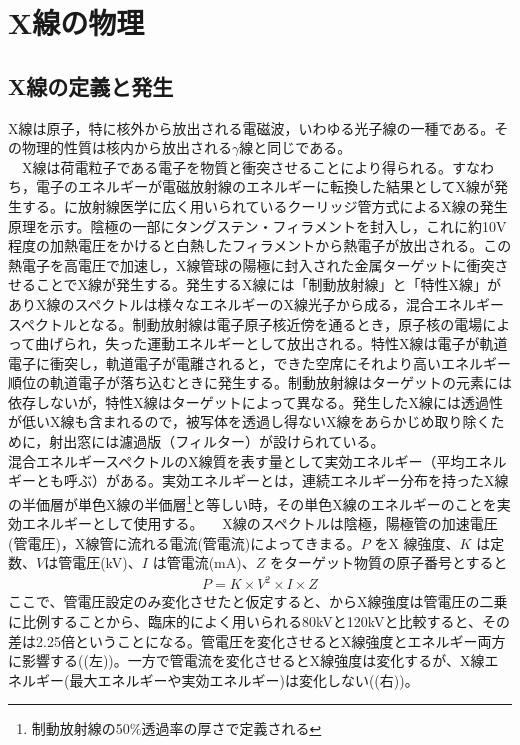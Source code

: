 
\chapter{X線の物理}
\section{X線の定義と発生}
X線は原子，特に核外から放出される電磁波，いわゆる光子線の一種である。その物理的性質は核内から放出される$\gamma$線と同じである。\\
\ \ X線は荷電粒子である電子を物質と衝突させることにより得られる。すなわち，電子のエネルギーが電磁放射線のエネルギーに転換した結果としてX線が発生する。に放射線医学に広く用いられているクーリッジ管方式によるX線の発生原理を示す。陰極の一部にタングステン・フィラメントを封入し，これに約10V程度の加熱電圧をかけると白熱したフィラメントから熱電子が放出される。この熱電子を高電圧で加速し，X線管球の陽極に封入された金属ターゲットに衝突させることでX線が発生する。発生するX線には「制動放射線」と「特性X線」がありX線のスペクトルは様々なエネルギーのX線光子から成る，混合エネルギースペクトルとなる。制動放射線は電子原子核近傍を通るとき，原子核の電場によって曲げられ，失った運動エネルギーとして放出される。特性X線は電子が軌道電子に衝突し，軌道電子が電離されると，できた空席にそれより高いエネルギー順位の軌道電子が落ち込むときに発生する。制動放射線はターゲットの元素には依存しないが，特性X線はターゲットによって異なる。発生したX線には透過性が低いX線も含まれるので，被写体を透過し得ないX線をあらかじめ取り除くために，射出窓には濾過版（フィルター）が設けられている。\\混合エネルギースペクトルのX線質を表す量として実効エネルギー（平均エネルギーとも呼ぶ）がある。実効エネルギーとは，連続エネルギー分布を持ったX線の半価層が単色X線の半価層\footnote{制動放射線の50$\%$透過率の厚さで定義される}と等しい時，その単色X線のエネルギーのことを実効エネルギーとして使用する。
\ \ X線のスペクトルは陰極，陽極管の加速電圧(管電圧)，X線管に流れる電流(管電流)によってきまる。$P$ をX 線強度、$K$ は定数、$V $は管電圧(kV)、$I$ は管電流(mA)、$Z$ をターゲット物質の原子番号とすると
\begin{align}
P=K\times V^2\times I \times Z\label{eq:intensity}
\end{align}
ここで、管電圧設定のみ変化させたと仮定すると、からX線強度は管電圧の二乗に比例することから、臨床的によく用いられる80kVと120kVと比較すると、その差は2.25倍ということになる。管電圧を変化させるとX線強度とエネルギー両方に影響する((左))。一方で管電流を変化させるとX線強度は変化するが、X線エネルギー(最大エネルギーや実効エネルギー)は変化しない((右))。


